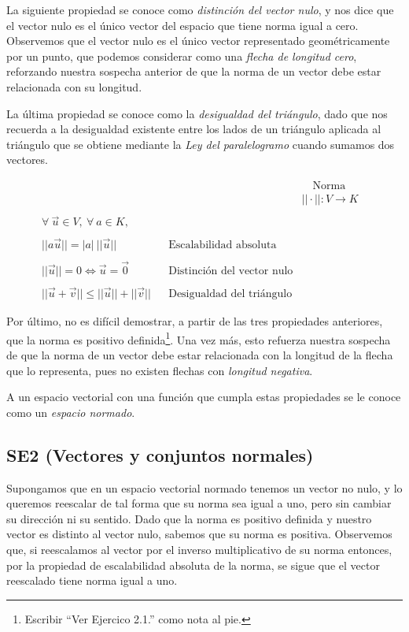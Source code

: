 \documentclass[12pt,dvipsnames]{article}
\numberwithin{equation}{section}
\begin{document}
La siguiente propiedad se conoce como \emph{distinción del vector nulo}, y nos dice que el vector nulo es el único vector del espacio que tiene norma igual a cero. Observemos que el vector nulo es el único vector representado geométricamente por un punto, que podemos considerar como una \emph{flecha de longitud cero}, reforzando nuestra sospecha anterior de que la norma de un vector debe estar relacionada con su longitud.

La última propiedad se conoce como la \emph{desigualdad del triángulo}, dado que nos recuerda a la desigualdad existente entre los lados de un triángulo aplicada al triángulo que se obtiene mediante la \emph{Ley del paralelogramo} cuando sumamos dos vectores.

\begin{align*}
     & & &\quad \text{Norma}& \\
     & & &||\cdot||:V\to K& \\
     \\
     \forall \ \vec{u}\in V, \ \forall \ a\in K, \\
     \\
     ||a\vec{u}|| = |a| \ ||\vec{u}|| & &\text{Escalabilidad absoluta}\\
     \\
     ||\vec{u}|| = 0 \iff \vec{u} = \vec{0} & &\text{Distinción del vector nulo}\\
     \\
     ||\vec{u}+\vec{v}|| \le ||\vec{u}|| + ||\vec{v}|| & &\text{Desigualdad del triángulo}
\end{align*}

Por último, no es difícil demostrar, a partir de las tres propiedades anteriores, que la norma es positivo definida\footnote{Escribir ``Ver Ejercico 2.1.'' como nota al pie.}. Una vez más, esto refuerza nuestra sospecha de que la norma de un vector debe estar relacionada con la longitud de la flecha que lo representa, pues no existen flechas con \emph{longitud negativa}.

A un espacio vectorial con una función que cumpla estas propiedades se le conoce como un \emph{espacio normado}. 

\subsection{SE2 (Vectores y conjuntos normales)}

Supongamos que en un espacio vectorial normado tenemos un vector no nulo, y lo queremos reescalar de tal forma que su norma sea igual a uno, pero sin cambiar su dirección ni su sentido. Dado que la norma es positivo definida y nuestro vector es distinto al vector nulo, sabemos que su norma es positiva. Observemos que, si reescalamos al vector por el inverso multiplicativo de su norma entonces, por la propiedad de escalabilidad absoluta de la norma, se sigue que el vector reescalado tiene norma igual a uno. 
\end{document}
